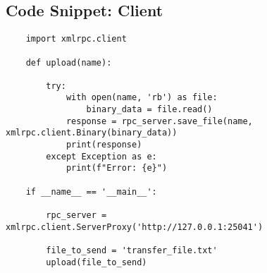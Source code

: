 \documentclass[12pt]{article}
\begin{document}
\subsection*{Code Snippet: Client}
\begin{verbatim}
    import xmlrpc.client

    def upload(name):
    
        try:
            with open(name, 'rb') as file:
                binary_data = file.read()
            response = rpc_server.save_file(name, xmlrpc.client.Binary(binary_data))
            print(response)
        except Exception as e:
            print(f"Error: {e}")
    
    if __name__ == '__main__':
    
        rpc_server = xmlrpc.client.ServerProxy('http://127.0.0.1:25041')
    
        file_to_send = 'transfer_file.txt'
        upload(file_to_send)
\end{verbatim}
\end{document}
